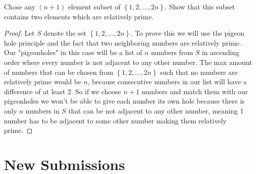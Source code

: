 \documentclass[11pt]{article}
\newenvironment{problem}[2][Problem\!]{\begin{trivlist}
\item[\hskip \labelsep {\bfseries #1}\hskip \labelsep {\bfseries #2}]}{\end{trivlist}}
\newcommand{\set}[1]{\left\{#1\right\}} %
\begin{document}
\newpage
\begin{tcolorbox}
    \begin{problem}{10/8 | OC | 30. }
        Chose any $(n+1)$ element subset of $\set{1,2,\dots, 2n}$. Show that this subset contains two elements which are relatively prime. 
    \end{problem}
\end{tcolorbox}
\begin{proof}
    Let $S$ denote the set $\set{1,2,\dots,2n}$. To prove this we will use the pigeon hole principle and the fact that two neighboring numbers are relatively prime. Our "pigeonholes" in this case will be a list of $n$ numbers from $S$ in ascending order where every number is not adjacent to any other number.  The max amount of numbers that can be chosen from $\set{1,2, \dots , 2n}$ such that no numbers are relatively prime would be $n$, because consecutive numbers in our list will have a difference of at least 2. So if we choose $n+1$ numbers and match them with our pigeonholes we won't be able to give each number its own hole because there is only $n$ numbers in $S$ that can be not adjacent to any other number, meaning 1 number has to be adjacent to some other number making them relatively prime. 
\end{proof}

\section{New Submissions}
\end{document}
